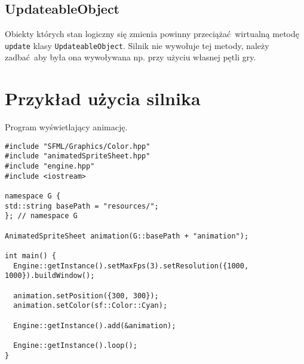 \documentclass[11pt]{article}
\begin{document}
\subsection{UpdateableObject}
\label{sec:orgb68f463}
Obiekty których stan logiczny się zmienia powinny przeciążać wirtualną metodę \texttt{update} klasy \texttt{UpdateableObject}.
Silnik nie wywołuje tej metody, należy zadbać aby była ona wywoływana np. przy użyciu własnej pętli gry.
\section{Przykład użycia silnika}
\label{sec:orgb901082}
Program wyświetlający animację.

\begin{verbatim}
#include "SFML/Graphics/Color.hpp"
#include "animatedSpriteSheet.hpp"
#include "engine.hpp"
#include <iostream>

namespace G {
std::string basePath = "resources/";
}; // namespace G

AnimatedSpriteSheet animation(G::basePath + "animation");

int main() {
  Engine::getInstance().setMaxFps(3).setResolution({1000, 1000}).buildWindow();

  animation.setPosition({300, 300});
  animation.setColor(sf::Color::Cyan);

  Engine::getInstance().add(&animation);

  Engine::getInstance().loop();
}
\end{verbatim}
\end{document}
